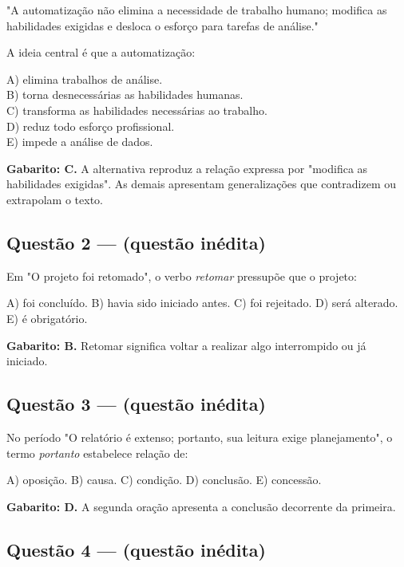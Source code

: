 \documentclass[11pt,a4paper]{article}
\begin{document}
"A automatização não elimina a necessidade de trabalho humano; modifica as habilidades exigidas e desloca o esforço para tarefas de análise."

A ideia central é que a automatização:

A) elimina trabalhos de análise. \\ B) torna desnecessárias as habilidades humanas. \\ C) transforma as habilidades necessárias ao trabalho. \\ D) reduz todo esforço profissional. \\ E) impede a análise de dados.

\begin{alerta}
\textbf{Gabarito: C.} A alternativa reproduz a relação expressa por "modifica as habilidades exigidas". As demais apresentam generalizações que contradizem ou extrapolam o texto.
\end{alerta}

\subsection*{Questão 2 — (questão inédita)}

Em "O projeto foi retomado", o verbo \textit{retomar} pressupõe que o projeto:

A) foi concluído. B) havia sido iniciado antes. C) foi rejeitado. D) será alterado. E) é obrigatório.

\begin{alerta}
\textbf{Gabarito: B.} Retomar significa voltar a realizar algo interrompido ou já iniciado.
\end{alerta}

\subsection*{Questão 3 — (questão inédita)}

No período "O relatório é extenso; portanto, sua leitura exige planejamento", o termo \textit{portanto} estabelece relação de:

A) oposição. B) causa. C) condição. D) conclusão. E) concessão.

\begin{alerta}
\textbf{Gabarito: D.} A segunda oração apresenta a conclusão decorrente da primeira.
\end{alerta}

\subsection*{Questão 4 — (questão inédita)}
\end{document}
